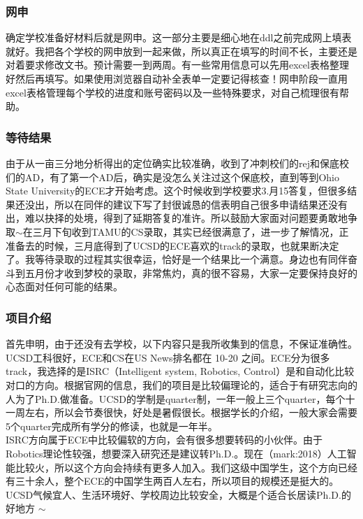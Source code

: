 \documentclass[a4paper,UTF8]{book}
\begin{document}
        \subsubsection*{网申}
        确定学校准备好材料后就是网申。这一部分主要是细心地在ddl之前完成网上填表就好。我把各个学校的网申放到一起来做，所以真正在填写的时间不长，主要还是对着要求修改文书。预计需要一到两周。有一些常用信息可以先用excel表格整理好然后再填写。如果使用浏览器自动补全表单一定要记得核查！网申阶段一直用excel表格管理每个学校的进度和账号密码以及一些特殊要求，对自己梳理很有帮助。

        \subsubsection*{等待结果}
        由于从一亩三分地分析得出的定位确实比较准确，收到了冲刺校们的rej和保底校们的AD，有了第一个AD后，确实是没怎么关注过这个保底校，直到等到Ohio State University的ECE才开始考虑。这个时候收到学校要求3.月15答复，但很多结果还没出，所以在同伴的建议下写了封很诚恳的信表明自己很多申请结果还没有出，难以抉择的处境，得到了延期答复的准许。所以鼓励大家面对问题要勇敢地争取$\sim$在三月下旬收到TAMU的CS录取，其实已经很满意了，进一步了解情况，正准备去的时候，三月底得到了UCSD的ECE喜欢的track的录取，也就果断决定了。我等待录取的过程其实很幸运，恰好是一个结果比一个满意。身边也有同伴奋斗到五月份才收到梦校的录取，非常焦灼，真的很不容易，大家一定要保持良好的心态面对任何可能的结果。

        \subsubsection*{项目介绍}
        首先申明，由于还没有去学校，以下内容只是我所收集到的信息，不保证准确性。\\
        UCSD工科很好，ECE和CS在US News排名都在 10-20 之间。ECE分为很多track，我选择的是ISRC（Intelligent system, Robotics, Control）是和自动化比较对口的方向。根据官网的信息，我们的项目是比较偏理论的，适合于有研究志向的人为了Ph.D.做准备。UCSD的学制是quarter制，一年一般上三个quarter，每个十一周左右，所以会节奏很快，好处是暑假很长。根据学长的介绍，一般大家会需要5个quarter完成所有学分的修读，也就是一年半。\\
        ISRC方向属于ECE中比较偏软的方向，会有很多想要转码的小伙伴。由于Robotics理论性较强，想要深入研究还是建议转Ph.D.。现在（mark:2018）人工智能比较火，所以这个方向会持续有更多人加入。我们这级中国学生，这个方向已经有三十余人，整个ECE的中国学生两百人左右，所以项目的规模还是挺大的。\\
        UCSD气候宜人、生活环境好、学校周边比较安全，大概是个适合长居读Ph.D.的好地方 $\sim$
\end{document}
